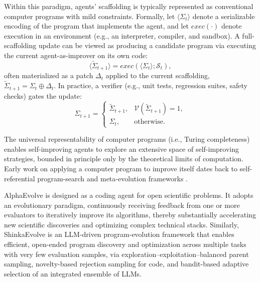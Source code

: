 \documentclass{article}
\begin{document}
Within this paradigm, agents' scaffolding is typically represented as conventional computer programs with mild constraints. {Formally,} let $\langle \Sigma_t \rangle$ denote a serializable encoding of the program that implements the agent, and let $exec(\cdot)$ denote execution in an environment (e.g., an interpreter, compiler, and sandbox).
A full-scaffolding update can be viewed as producing a candidate program via executing the current agent-as-improver on its own code:
\begin{equation}
\langle \tilde{\Sigma}_{t+1} \rangle = exec(\langle \Sigma_t \rangle;\mathcal{S}_t),
\end{equation}
often materialized as a patch $\Delta_t$ applied to the current scaffolding,
$\tilde{\Sigma}_{t+1} = \Sigma_t \oplus \Delta_t$.
In practice, a verifier (e.g., unit tests, regression suites, safety checks) gates the update:
\begin{equation}
\Sigma_{t+1}=
\begin{cases}
\tilde{\Sigma}_{t+1}, & \mathcal{V}(\tilde{\Sigma}_{t+1})=1,\\
\Sigma_t, & \text{otherwise}.
\end{cases}
\end{equation}

The universal representability of computer programs (i.e., Turing completeness) enables self-improving agents to explore an extensive space of self-improving strategies, bounded in principle only by the theoretical limits of computation. Early work on applying a computer program to improve itself dates back to self-referential program-search and meta-evolution frameworks \citep{schmidhuber1987selfreferential}.

AlphaEvolve \citep{novikov2025alphaevolvecodingagentscientific} is designed as a coding agent for open scientific problems. It adopts an evolutionary paradigm, continuously receiving feedback from one or more evaluators to iteratively improve its algorithms, thereby substantially accelerating new scientific discoveries and optimizing complex technical stacks. Similarly, ShinkaEvolve \citep{lange2025shinkaevolveopenendedsampleefficientprogram} is an LLM-driven program-evolution framework that enables efficient, open-ended program discovery and optimization across multiple tasks with very few evaluation samples, via exploration–exploitation–balanced parent sampling, novelty-based rejection sampling for code, and bandit-based adaptive selection of an integrated ensemble of LLMs.
\end{document}
